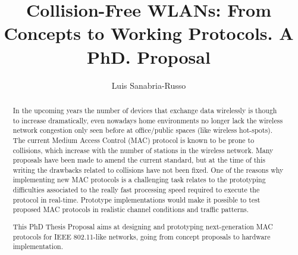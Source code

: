 \documentclass[]{llncs}
\begin{document}
\title{Collision-Free WLANs: From Concepts to Working Protocols. A PhD. Proposal}
\author{Luis Sanabria-Russo}
\maketitle

\begin{abstract}
In the upcoming years the number of devices that exchange data wirelessly is though to increase dramatically, even nowadays home environments no longer lack the wireless network congestion only seen before at office/public spaces (like wireless hot-spots). The current Medium Access Control (MAC) protocol is known to be prone to collisions, which increase with the number of stations in the wireless network. Many proposals have been made to amend the current standard, but at the time of this writing the drawbacks related to collisions have not been fixed. One of the reasons why implementing new MAC protocols is a challenging task relates to the prototyping difficulties associated to the really fast processing speed required to execute the protocol in real-time. Prototype implementations would make it possible to test proposed MAC protocols in realistic channel conditions and traffic patterns.


This PhD Thesis Proposal aims at designing and prototyping next-generation MAC protocols for IEEE 802.11-like networks, going from concept proposals to hardware implementation.



\end{abstract}
\end{document}
